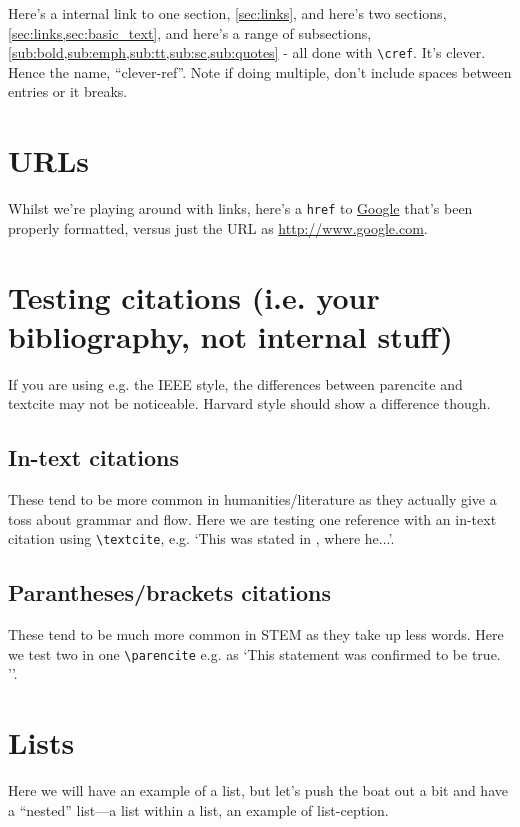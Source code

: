 \documentclass[../main]{subfiles}
\begin{document}
Here's a internal link to one section, \cref{sec:links}, and here's two sections, \cref{sec:links,sec:basic_text}, and here's a range of subsections, \cref{sub:bold,sub:emph,sub:tt,sub:sc,sub:quotes} - all done with \verb|\cref|. It's clever. Hence the name, ``clever-ref''. Note if doing multiple, don't include spaces between entries or it breaks.

\section{URLs}\label{sec:URL}
Whilst we're playing around with links, here's a \verb|href| to \href{http://www.google.com}{Google} that's been properly formatted, versus just the URL as \url{http://www.google.com}. 


\section{Testing citations (i.e. your bibliography, not internal stuff)}\label{sec:ref_test}

If you are using e.g. the IEEE style, the differences between parencite and textcite may not be noticeable. Harvard style should show a difference though.

\subsection{In-text citations}
These tend to be more common in humanities/literature as they actually give a toss about grammar and flow.
Here we are testing one reference with an in-text citation using \verb|\textcite|, e.g. `This was stated in \textcite{einstein}, where he...'. 

\subsection{Parantheses/brackets citations}
These tend to be much more common in STEM as they take up less words. Here we test two in one \verb|\parencite| e.g. as `This statement was confirmed to be true. \parencite{knuthwebsite,latexcompanion}''.


\section{Lists} \label{sec:lists}

Here we will have an example of a list, but let's push the boat out a bit and have a ``nested'' list---a list within a list, an example of list-ception.
\end{document}
